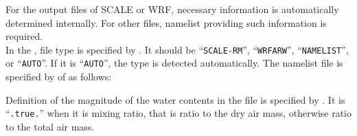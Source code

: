 For the output files of SCALE or WRF, necessary information is automatically determined internally.
For other files, namelist providing such information is required.\\
In the , file type is specified by .
It should be ``\verb|SCALE-RM|'', ``\verb|WRFARW|'', ``\verb|NAMELIST|'', or ``\verb|AUTO|''.
If it is ``\verb|AUTO|'', the type is detected automatically.
The namelist file is specified by  of  as follows:

Definition of the magnitude of the water contents in the file is specified by .
It is ``\verb|.true.|'' when it is mixing ratio, that is ratio to the dry air mass, otherwise ratio to the total air mass.


